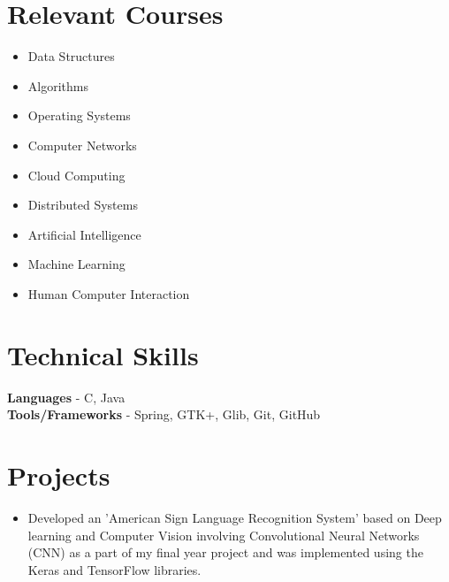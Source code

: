 \documentclass[11pt,margin, centered]{res}
\begin{document}
\begin{resume}
\section{Relevant Courses}
\vspace{8mm}
\begin{multicols}{3}
    \begin{itemize}
      \item Data Structures
      \item Algorithms
      \item Operating Systems
      \item Computer Networks
      \item Cloud Computing
      \item Distributed Systems
      \item Artificial Intelligence
      \item Machine Learning
      \item Human Computer Interaction
    \end{itemize}
\end{multicols}

\section{Technical \hspace{2mm} Skills}
\vspace{8mm}
\textbf{Languages} - C, Java \\
\textbf{Tools/Frameworks} - Spring, GTK+, Glib, Git, GitHub

\section{Projects}
\vspace{10mm}
\begin{itemize}[leftmargin=*]
 \item Developed an 'American Sign Language Recognition System' based on Deep learning and Computer Vision involving Convolutional Neural Networks (CNN) as a part of my final year project and was implemented using the Keras and TensorFlow libraries.
\end{itemize}


\end{resume}
\end{document}
